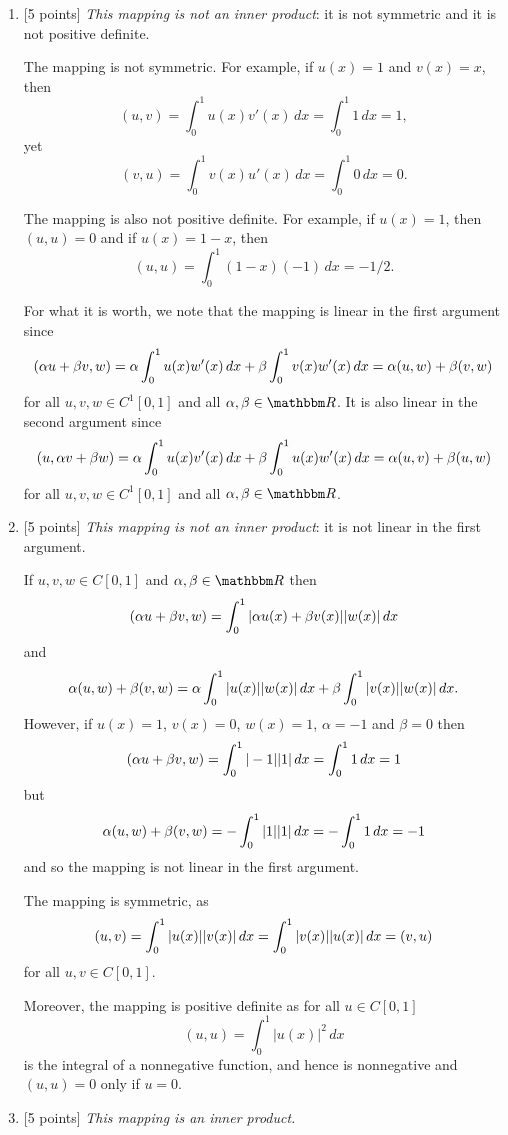 \begin{solution}
\begin{enumerate}
\item {[5 points]} \emph{This mapping is not an inner product}: it is not symmetric and it is not positive definite.

The mapping is not symmetric. For example, if $u(x) = 1$ and $v(x) = x$, then
\[
(u,v) = \int_0^1 u(x) v'(x) \, dx = \int_0^1 1\, dx = 1,
\]
yet
\[
(v,u) = \int_0^1 v(x) u'(x) \, dx = \int_0^1 0\, dx = 0.
\]

The mapping is also not positive definite. For example, if $u(x) = 1$, then $(u,u) = 0$ and if $u(x) = 1-x$, then
\[
(u,u) = \int_0^1 (1-x)(-1)\, dx = -1/2.
\]

For what it is worth, we note that the mapping is linear in the first argument since
\[
(\alpha u + \beta v, w) = \alpha \int_0^1 u(x) w'(x) \,dx + \beta\int_0^1 v(x) w'(x)\,dx = \alpha(u,w) + \beta(v,w) \]
for all $u,v,w\in C^1[0,1]$ and all $\alpha,\beta\in\R$. It is also linear in the second argument since
\[
(u,\alpha v+\beta w) = \alpha \int_0^1 u(x) v'(x) \,dx + \beta\int_0^1 u(x) w'(x)\,dx = \alpha(u,v) + \beta(u,w)
\]
for all $u,v,w\in C^1[0,1]$ and all $\alpha,\beta\in\R$.
\\
\item {[5 points]} \emph{This mapping is not an inner product}: it is not linear in the first argument.

If $u,v,w\in C[0,1]$ and $\alpha,\beta\in\R$ then
\[
(\alpha u+\beta v,w) = \int_0^1 |\alpha u(x)+\beta v(x)| |w(x)|\, d x
\]
and
\[
\alpha(u,w)+\beta(v,w) = \alpha\int_0^1 |u(x)| |w(x)| \, d x + \beta\int_0^1 |v(x)| |w(x)| \, d x.
\]
However, if $u(x)=1$, $v(x)=0$, $w(x)=1$, $\alpha=-1$ and $\beta=0$ then
\[
(\alpha u+\beta v,w) = \int_0^1 |-1| |1|\, d x = \int_0^1 1\, d x = 1
\]
but
\[
\alpha(u,w)+\beta(v,w) = -\int_0^1 |1| |1| \, d x = -\int_0^1 1\, d x = -1
\]
and so the mapping is not linear in the first argument.

The mapping is symmetric, as 
\[
(u,v) = \int_0^1 |u(x)| |v(x)|\, d x =  \int_0^1 |v(x)| |u(x)| \, d x = (v,u)
\]
for all $u,v\in C[0,1]$.

Moreover, the mapping is positive definite as for all $u\in C[0,1]$
\[
(u,u) = \int_0^1 |u(x)|^2\, dx
\]
is the integral of a nonnegative function, and hence is nonnegative and $(u,u)=0$ only if $u=0$.
\\
\item {[5 points]} \emph{This mapping is an inner product.}


\end{enumerate}
\end{solution}
